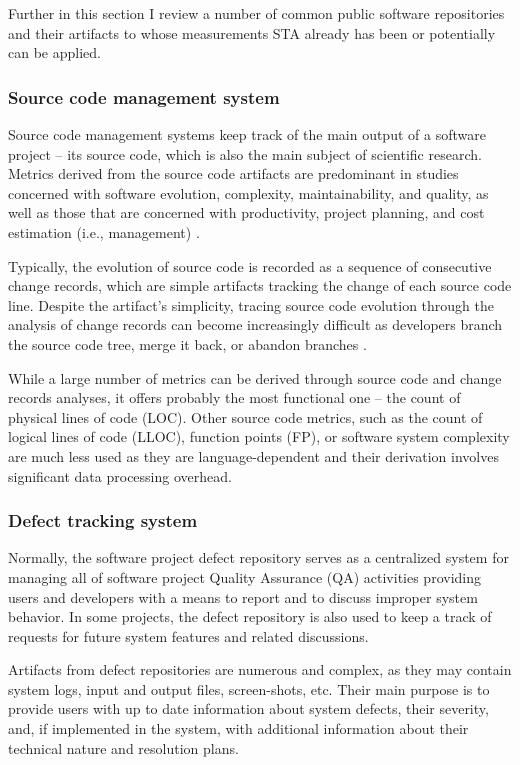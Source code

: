 Further in this section I review a number of common public software repositories and their artifacts to whose measurements 
STA already has been or potentially can be applied. 

\subsubsection{Source code management system}
Source code management systems keep track of the main output of a software project -- its source code, which is also the 
main subject of scientific research. Metrics derived from the source code artifacts are predominant in studies concerned 
with software evolution, complexity, maintainability, and quality, as well as those that are concerned with productivity, 
project planning, and cost estimation (i.e., management) \cite{citeulike:4534888}. 

Typically, the evolution of source code is recorded as a sequence of consecutive change records, which are simple artifacts
tracking the change of each source code line. Despite the artifact's simplicity, tracing source code evolution through 
the analysis of change records can become increasingly difficult as developers branch the source code tree, merge it back, 
or abandon branches \cite{citeulike:13156191}.

While a large number of metrics can be derived through source code and change records analyses, it offers probably 
the most functional one -- the count of physical lines of code (LOC). Other source code metrics, such as the count of logical lines 
of code (LLOC), function points (FP), or software system complexity are much less used as they are language-dependent and their 
derivation involves significant data processing overhead.

\subsubsection{Defect tracking system}
Normally, the software project defect repository serves as a centralized system for managing all of software project 
Quality Assurance (QA) activities providing users and developers with a means to report and to discuss improper system 
behavior.
In some projects, the defect repository is also used to keep a track of requests for future system features and related
discussions.

Artifacts from defect repositories are numerous and complex, as they may contain system logs, input and output files, 
screen-shots, etc. Their main purpose is to provide users with up to date information about system defects, their severity, 
and, if implemented in the system, with additional information about their technical nature and resolution plans.

